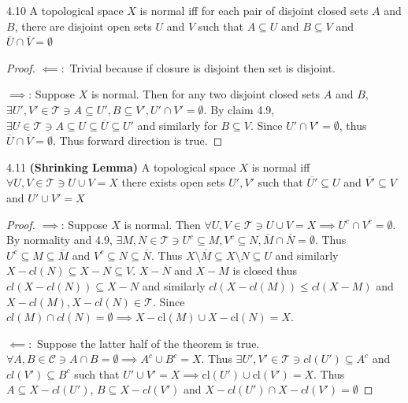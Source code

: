 \documentclass{article}
\newcommand*{\T}{\mathcal{T}}
\newcommand*{\cl}{\mathrm{cl}}
\begin{document}
\bigskip

\begin{claim}{4.10}\label{Claim 4.10.}
    A topological space $X$ is normal iff for each pair of disjoint closed sets $A$ and $B$, there are disjoint open sets $U$ and $V$ such that $A \subseteq U$ and $B \subseteq V$ and $\overline{U} \cap \overline{V} = \emptyset$        
\end{claim}
\begin{proof}
    $\impliedby:$ Trivial because if closure is disjoint then set is disjoint.
    
    $\implies$: Suppose $X$ is normal. Then for any two disjoint closed sets $A$ and $B$, $\exists U', V' \in \T \ni A \subseteq U', B \subseteq V', U' \cap V' = \emptyset$. By claim 4.9, $\exists U \in \T \ni A \subseteq U \subseteq \overline{U} \subseteq U'$ and similarly for $B \subseteq V$. Since $U' \cap V' = \emptyset$, thus $\overline{U} \cap \overline{V} = \emptyset$. Thus forward direction is true.            
\end{proof}

\bigskip

\begin{claim}{4.11}\label{Claim 4.11.}
    \textbf{(Shrinking Lemma)} A topological space $X$ is normal iff $\forall U, V \in \T \ni U \cup V = X$ there exists open sets $U', V'$ such that $\overline{U'} \subseteq U$ and $\overline{V'} \subseteq V$ and $U' \cup V' = X$      
\end{claim}
\begin{proof}
    $\implies$: Suppose $X$ is normal. Then $\forall U ,V \in \T \ni U \cup V = X \implies U^c \cap V^c = \emptyset$. By normality and 4.9, $\exists M, N \in \T \ni U^c \subseteq M, V^c \subseteq N, \overline{M} \cap \overline{N} = \emptyset$. Thus $U^c \subseteq M \subseteq \overline{M}$ and $V^c \subseteq N \subseteq \overline{N}$. Thus $X \setminus \overline{M} \subseteq X \setminus N \subseteq U$ and similarly $X - cl(N) \subseteq X - N \subseteq V$. $X - N$ and $X - M$ is closed thus $cl(X - cl(N)) \subseteq X - N$ and similarly $cl(X - cl(M)) \leq cl(X - M)$ and $X - cl(M), X - cl(N) \in \T$. Since $cl(M) \cap cl(N) = \emptyset \implies X - \cl(M) \cup X - \cl(N) = X$.   
    
    $\impliedby:$ Suppose the latter half of the theorem is true. $\forall A, B \in \mathcal{C} \ni A \cap B = \emptyset \implies A^c \cup B^c = X$. Thus $\exists U', V' \in \T \ni cl(U') \subseteq A^c$ and $cl(V') \subseteq B^c$ such that $U' \cup V' = X \implies \cl(U') \cup \cl(V') = X$. Thus $A \subseteq X - cl(U')$, $B \subseteq X - cl(V')$ and $X - cl(U') \cap X - cl(V') = \emptyset$        
\end{proof}
\end{document}
